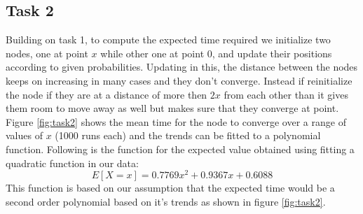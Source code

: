 \documentclass[answers]{exam}
\begin{document}
\subsection {Task 2}
\begin{solution}
    Building on task 1, to compute the expected time required we initialize two nodes, one at point $x$ while other one at point $0$, and update their positions according to given probabilities. Updating in this, the distance between the nodes keeps on increasing in many cases and they don't converge. Instead if reinitialize the node if they are at a distance of more then $2x$ from each other than it gives them room to move away as well but makes sure that they converge at point. Figure \ref{fig:task2} shows the mean time for the node to converge over a range of values of $x$ (1000 runs each) and the trends can be fitted to a polynomial function. Following is the function for the expected value obtained using fitting a quadratic function in our data:
    \[E[X=x]=0.7769x^2+0.9367x+0.6088\]
    This function is based on our assumption that the expected time would be a second order polynomial based on it's trends as shown in figure \ref{fig:task2}.
\end{solution}
\end{document}
